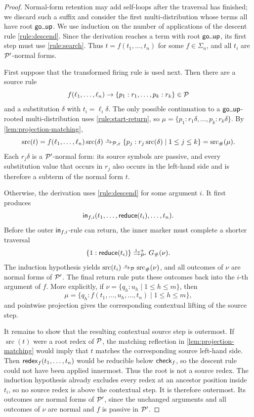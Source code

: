 \begin{proof}
  Normal-form retention may add self-loops after the traversal has finished; we
  discard such a suffix and consider the first multi-distribution whose terms all
  have root \(\tgoup\).
  We use induction on the number of applications of the descent rule
  \eqref{rule:descend}.  Since the derivation reaches a term with root
  \(\tgoup\), its first step must use \eqref{rule:search}.  Thus
  \(t=f(t_1,\ldots,t_n)\) for some \(f\in\Sigma_n\), and all \(t_i\) are
  \(\P'\)-normal forms.

  First suppose that the transformed firing rule is used next.  Then there are
  a source rule
  \[
    f(\ell_1,\ldots,\ell_n)
      \to\{p_1:r_1,\ldots,p_k:r_k\}\in\P
  \]
  and a substitution \(\delta\) with \(t_i=\ell_i\delta\).  The only possible
  continuation to a \(\tgoup\)-rooted multi-distribution uses
  \eqref{rule:start-return}, so
  \(\mu=\{p_1:r_1\delta,\ldots,p_k:r_k\delta\}\).  By
  \cref{lem:projection-matching},
  \[
    \operatorname{src}(t)
      =f(\ell_1,\ldots,\ell_n)\operatorname{src}(\delta)
      \oto_{\P,\varepsilon}
      \{p_j:r_j\operatorname{src}(\delta)\mid1\leq j\leq k\}
      =\operatorname{src}_{\#}(\mu).
  \]
  Each \(r_j\delta\) is a \(\P'\)-normal form: its source symbols are passive,
  and every substitution value that occurs in \(r_j\) also occurs in the
  left-hand side and is therefore a subterm of the normal form \(t\).

  Otherwise, the derivation uses \eqref{rule:descend} for some argument
  \(i\).  It first produces
  \[
    \tin_{f,i}(t_1,\ldots,\treduce(t_i),\ldots,t_n).
  \]
  Before the outer \(\tin_{f,i}\)-rule can return, the inner marker must
  complete a shorter traversal
  \[
    \{1:\treduce(t_i)\}
      \iliftto_{\P'}^{+}G_{\#}(\nu).
  \]
  The induction hypothesis yields
  \(\operatorname{src}(t_i)\oto_{\P}
    \operatorname{src}_{\#}(\nu)\), and all outcomes of \(\nu\) are normal
  forms of \(\P'\).  The final return rule puts these outcomes back into the
  \(i\)-th argument of \(f\).  More explicitly, if
  \(\nu=\{q_h:u_h\mid1\leq h\leq m\}\), then
  \[
    \mu=\{q_h:f(t_1,\ldots,u_h,\ldots,t_n)
             \mid1\leq h\leq m\},
  \]
  and pointwise projection gives the corresponding contextual lifting of the
  source step.

  It remains to show that the resulting contextual source step is outermost.
  If \(\operatorname{src}(t)\) were a root redex of \(\P\), the matching
  reflection in \cref{lem:projection-matching} would imply that
  \(t\) matches the corresponding source left-hand side.  Then
  \(\tredex_f(t_1,\ldots,t_n)\) would be reducible below \(\tcheck_f\), so the
  descent rule could not have been applied innermost.  Thus the root is not a
  source redex.  The induction hypothesis already excludes every redex at an
  ancestor position inside \(t_i\), so no source redex is above the contextual
  step.  It is therefore outermost.  Its outcomes are normal forms of \(\P'\), since the
  unchanged arguments and all outcomes of \(\nu\) are normal and \(f\) is
  passive in \(\P'\).
\end{proof}

